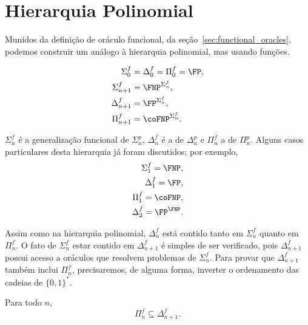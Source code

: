 \section{Hierarquia Polinomial}

Munidos da definição de oráculo funcional,
da seção~\ref{sec:functional_oracles},
podemos construir um análogo à hierarquia polinomial,
mas usando funções.

\begin{definition}
    \begin{align*}
        \Sigma_0^f &= \Delta_0^f = \Pi_0^f = \FP, \\
        \Sigma_{n+1}^f &= \FNP^{\Sigma_n^f}, \\
        \Delta_{n+1}^f &= \FP^{\Sigma_n^f}, \\
        \Pi_{n+1}^f &= \coFNP^{\Sigma_n^f}.
    \end{align*}
\end{definition}

$\Sigma_n^f$ é a generalização funcional de $\Sigma_n^p$,
$\Delta_n^f$ é a de $\Delta_n^p$
e $\Pi_n^f$ a de $\Pi_n^p$.
Alguns casos particulares desta hierarquia já foram discutidos;
por exemplo,
\begin{align*}
    \Sigma_1^f = \FNP, \\
    \Delta_1^f = \FP, \\
    \Pi_1^f = \coFNP, \\
    \Delta_2^f = \FP^\FNP.
\end{align*}

Assim como na hierarquia polinomial,
$\Delta_n^f$ está contido tanto em $\Sigma_n^f$ quanto em $\Pi_n^f$.
O fato de $\Sigma_n^f$ estar contido em $\Delta_{n+1}^f$
é simples de ser verificado,
pois $\Delta_{n+1}^f$ possui acesso a oráculos
que resolvem problemas de $\Sigma_n^f$.
Para provar que $\Delta_{n+1}^f$ também inclui $\Pi_n^f$,
precisaremos, de alguma forma,
inverter o ordenamento das cadeias de $\{0, 1\}^*$.

\begin{proposition}
    Para todo $n$,
    \begin{equation*}
        \Pi_n^f \subseteq \Delta_{n+1}^f.
    \end{equation*}
\end{proposition}


